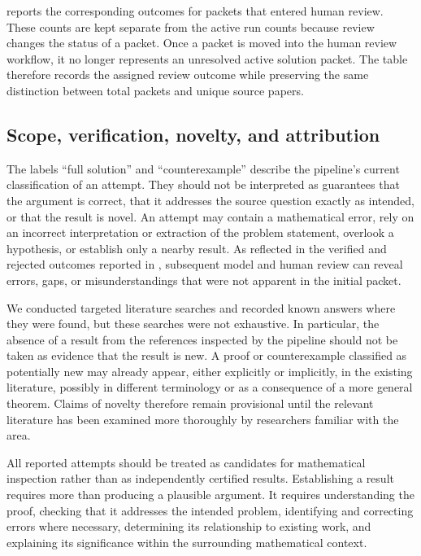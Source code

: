 \documentclass[11pt,reqno]{amsart}
\theoremstyle{plain}
\theoremstyle{definition}
\begin{document}
 reports the corresponding outcomes for packets that entered human review. These counts are kept separate from the active run counts because review changes the status of a packet. Once a packet is moved into the human review workflow, it no longer represents an unresolved active solution packet. The table therefore records the assigned review outcome while preserving the same distinction between total packets and unique source papers.

\subsection{Scope, verification, novelty, and attribution}
\label{sec:scope-verification-attribution}

The labels ``full solution'' and ``counterexample'' describe the pipeline's current classification of an attempt. They should not be interpreted as guarantees that the argument is correct, that it addresses the source question exactly as intended, or that the result is novel. An attempt may contain a mathematical error, rely on an incorrect interpretation or extraction of the problem statement, overlook a hypothesis, or establish only a nearby result. As reflected in the verified and rejected outcomes reported in , subsequent model and human review can reveal errors, gaps, or misunderstandings that were not apparent in the initial packet.

We conducted targeted literature searches and recorded known answers where they were found, but these searches were not exhaustive. In particular, the absence of a result from the references inspected by the pipeline should not be taken as evidence that the result is new. A proof or counterexample classified as potentially new may already appear, either explicitly or implicitly, in the existing literature, possibly in different terminology or as a consequence of a more general theorem. Claims of novelty therefore remain provisional until the relevant literature has been examined more thoroughly by researchers familiar with the area.

All reported attempts should be treated as candidates for mathematical inspection rather than as independently certified results. Establishing a result requires more than producing a plausible argument. It requires understanding the proof, checking that it addresses the intended problem, identifying and correcting errors where necessary, determining its relationship to existing work, and explaining its significance within the surrounding mathematical context.
\end{document}
